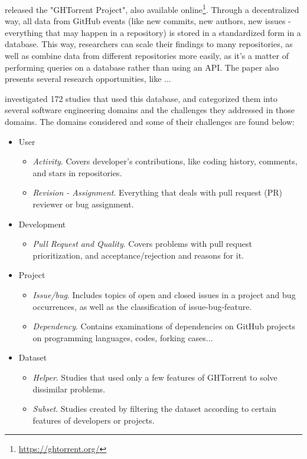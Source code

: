 \cite{Gousios_2013} released the "GHTorrent Project", also available online\footnote{\url{https://ghtorrent.org/}}. Through a decentralized way, all data from GitHub events (like new commits, new authors, new issues - everything that may happen in a repository) is stored in a standardized form in a database.
This way, researchers can scale their findings to many repositories, as well as combine data from different repositories more easily, as it's a matter of performing queries on a database rather than using an API. The paper also presents several research opportunities, like ...

\cite{Seker_2020} investigated 172 studies that used this database, and categorized them into several software engineering domains and the challenges they addressed in those domains. The domains considered and some of their challenges are found below:

\begin{itemize}
    \item User
        \begin{itemize}
            \item \textit{Activity}. Covers developer's contributions, like coding history, comments, and stars in repositories.
            \item \textit{Revision - Assignment}. Everything that deals with pull request (PR) reviewer or bug assignment.
        \end{itemize}
    \item Development
        \begin{itemize}
            \item \textit{Pull Request and Quality}. Covers problems with pull request prioritization, and acceptance/rejection and reasons for it.
        \end{itemize}
    \item Project
        \begin{itemize}
            \item \textit{Issue/bug}. Includes topics of open and closed issues in a project and bug occurrences, as well as the classification of issue-bug-feature.
            \item \textit{Dependency}. Contains examinations of dependencies on GitHub projects on programming languages, codes, forking cases...
        \end{itemize}
    \item Dataset
        \begin{itemize}
            \item \textit{Helper}. Studies that used only a few features of GHTorrent to solve dissimilar problems.
            \item \textit{Subset}. Studies created by filtering the dataset according to certain features of developers or projects.
        \end{itemize}
\end{itemize}

